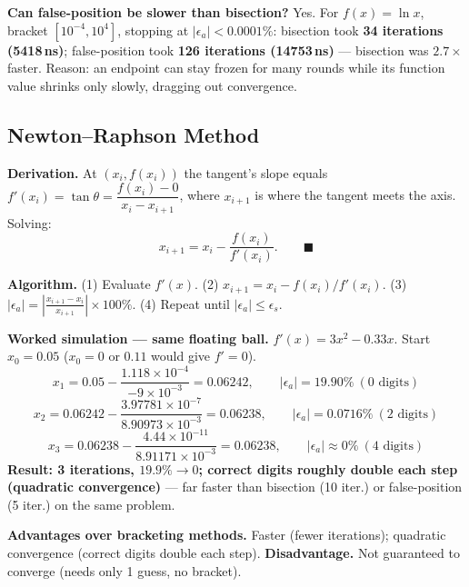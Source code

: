 \begin{keypoint}
\textbf{Can false-position be slower than bisection?} Yes. For $f(x)=\ln x$, bracket $[10^{-4},10^4]$, stopping at $|\epsilon_a|<0.0001\%$: bisection took \textbf{34 iterations (5418\,ns)}; false-position took \textbf{126 iterations (14753\,ns)} — bisection was $2.7\times$ faster. Reason: an endpoint can stay frozen for many rounds while its function value shrinks only slowly, dragging out convergence.
\end{keypoint}

\subsection{Newton--Raphson Method}

\begin{examplebox}
\textbf{Derivation.} At $(x_i,f(x_i))$ the tangent's slope equals $f'(x_i)=\tan\theta=\dfrac{f(x_i)-0}{x_i-x_{i+1}}$, where $x_{i+1}$ is where the tangent meets the axis. Solving:
\[
x_{i+1} = x_i - \frac{f(x_i)}{f'(x_i)}. \qquad\blacksquare
\]
\end{examplebox}

\textbf{Algorithm.} (1) Evaluate $f'(x)$. (2) $x_{i+1}=x_i-f(x_i)/f'(x_i)$. (3) $|\epsilon_a|=\left|\frac{x_{i+1}-x_i}{x_{i+1}}\right|\times100\%$. (4) Repeat until $|\epsilon_a|\le\epsilon_s$.

\begin{examplebox}
\textbf{Worked simulation — same floating ball.} $f'(x)=3x^2-0.33x$. Start $x_0=0.05$ ($x_0=0$ or $0.11$ would give $f'=0$).
\[
x_1 = 0.05 - \frac{1.118\times10^{-4}}{-9\times10^{-3}} = 0.06242, \qquad |\epsilon_a|=19.90\%\ (0\text{ digits})
\]
\[
x_2 = 0.06242 - \frac{3.97781\times10^{-7}}{8.90973\times10^{-3}} = 0.06238, \qquad |\epsilon_a|=0.0716\%\ (2\text{ digits})
\]
\[
x_3 = 0.06238 - \frac{4.44\times10^{-11}}{8.91171\times10^{-3}} = 0.06238, \qquad |\epsilon_a|\approx0\%\ (4\text{ digits})
\]
\textbf{Result: 3 iterations, $19.9\%\to0$; correct digits roughly double each step (quadratic convergence)} — far faster than bisection (10 iter.) or false-position (5 iter.) on the same problem.
\end{examplebox}

\textbf{Advantages over bracketing methods.} Faster (fewer iterations); quadratic convergence (correct digits double each step). \textbf{Disadvantage.} Not guaranteed to converge (needs only 1 guess, no bracket).

